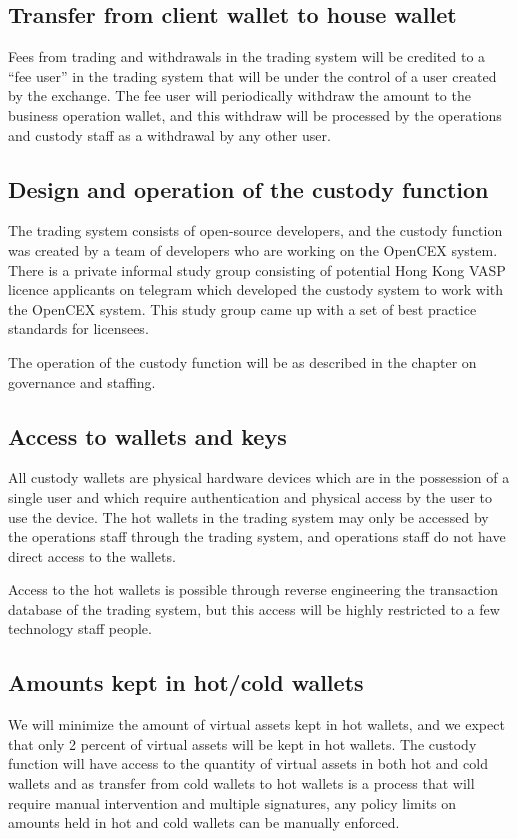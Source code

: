 \subsection{Transfer from client wallet to house wallet}
Fees from trading and withdrawals in the trading system will be
credited to a ``fee user'' in the trading system that will be under
the control of a user created by the exchange.  The fee user will
periodically withdraw the amount to the business operation wallet,
and this withdraw will be processed by the operations and custody
staff as a withdrawal by any other user.

\subsection{Design and operation of the custody function}

The trading system consists of open-source developers, and the custody
function was created by a team of developers who are working on the
OpenCEX system.  There is a private informal study group consisting of
potential Hong Kong VASP licence applicants on telegram which
developed the custody system to work with the OpenCEX system. This
study group came up with a set of best practice standards for
licensees.

The operation of the custody function will be as described in the
chapter on governance and staffing.

\subsection{Access to wallets and keys}

All custody wallets are physical hardware devices which are in the
possession of a single user and which require authentication and
physical access by the user to use the device.  The hot wallets
in the trading system may only be accessed by the operations staff
through the trading system, and operations staff do not have direct
access to the wallets.

Access to the hot wallets is possible through reverse engineering the
transaction database of the trading system, but this access will be
highly restricted to a few technology staff people.

\subsection{Amounts kept in hot/cold wallets}
We will minimize the amount of virtual assets kept in hot wallets, and
we expect that only 2 percent of virtual assets will be kept in hot
wallets.  The custody function will have access to the quantity of
virtual assets in both hot and cold wallets and as transfer from cold
wallets to hot wallets is a process that will require manual
intervention and multiple signatures, any policy limits on amounts
held in hot and cold wallets can be manually enforced.

